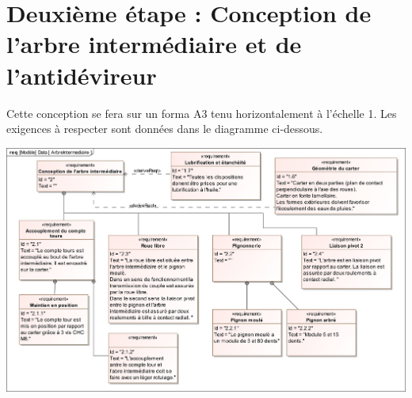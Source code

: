 \documentclass[10pt,fleqn]{article} %
\begin{document}
\section{Deuxième étape : Conception de l'arbre intermédiaire et de l'antidévireur}

Cette conception se fera sur un forma A3 tenu horizontalement à l'échelle 1. Les exigences à respecter sont données dans le diagramme ci-dessous.

\begin{center}
\includegraphics[width=\textwidth]{images/SysML/ArbreIntermediaire}
\end{center}

\end{document}
